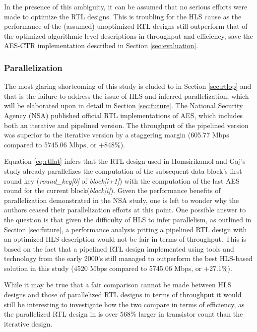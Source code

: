 \documentclass[12pt,journal,compsoc,onecolumn]{IEEEtran}
\begin{document}
In the presence of this ambiguity, it can be assumed that no serious efforts were made to optimize the RTL designs. This is troubling for the HLS cause as the performance of the (assumed) unoptimized RTL designs still outperform that of the optimized algorithmic level descriptions in throughput and efficiency, save the AES-CTR implementation described in Section \ref{sec:evaluation}.

\subsubsection{Parallelization}\label{sec:parallel}
The most glaring shortcoming of this study is eluded to in Section \ref{sec:rtlop} and that is the failure to address the issue of HLS and inferred parallelization, which will be elaborated upon in detail in Section \ref{sec:future}. The National Security Agency (NSA) published official RTL implementations of AES, which includes both an iterative and pipelined version\cite{nsa}. The throughput of the pipelined version was superior to the iterative version by a staggering margin (605.77 Mbps compared to 5745.06 Mbps, or +848\%)\cite{nsaweeks}.

Equation \ref{eq:rtllat} infers that the RTL design used in Homsirikamol and Gaj's study already parallelizes the computation of the subsequent data block's first round key (\emph{round\_key[0]} of \emph{block[i+1]}) with the computation of the last AES round for the current block(\emph{block[i]}). Given the performance benefits of parallelization demonstrated in the NSA study, one is left to wonder why the authors ceased their parallelization efforts at this point. One possible answer to the question is that given the difficulty of HLS to infer parallelism, as outlined in Section \ref{sec:future}, a performance analysis pitting a pipelined RTL design with an optimized HLS description would not be fair in terms of throughput. This is based on the fact that a pipelined RTL design implemented using tools and technology from the early 2000's still managed to outperform the best HLS-based solution in this study (4520 Mbps compared to 5745.06 Mbps\cite{nsaweeks}, or +27.1\%). 

While it may be true that a fair comparison cannot be made between HLS designs and those of parallelized RTL designs in terms of throughput it would still be interesting to investigate how the two compare in terms of efficiency, as the parallelized RTL design in \cite{nsaweeks} is over 568\% larger in transistor count than the iterative design. 
\end{document}
